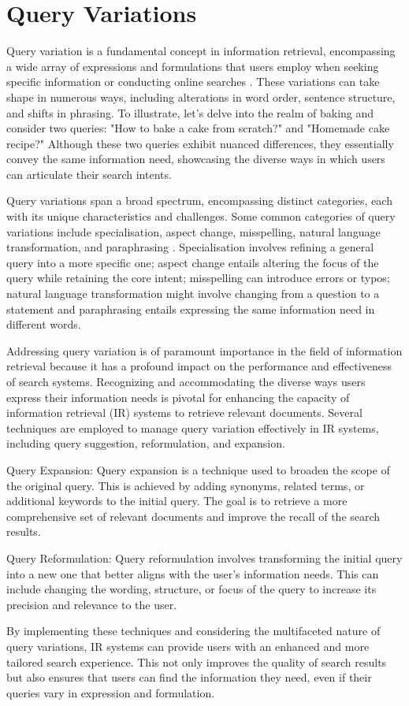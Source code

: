 \section{Query Variations}
Query variation is a fundamental concept in information retrieval, encompassing a wide array of expressions and formulations that users employ when seeking specific information or conducting online searches \cite{zendel}. These variations can take shape in numerous ways, including alterations in word order, sentence structure, and shifts in phrasing. To illustrate, let's delve into the realm of baking and consider two queries: "How to bake a cake from scratch?" and "Homemade cake recipe?" Although these two queries exhibit nuanced differences, they essentially convey the same information need, showcasing the diverse ways in which users can articulate their search intents.

Query variations span a broad spectrum, encompassing distinct categories, each with its unique characteristics and challenges. Some common categories of query variations include specialisation, aspect change, misspelling, natural language transformation, and paraphrasing \cite{penha2022}. Specialisation involves refining a general query into a more specific one; aspect change entails altering the focus of the query while retaining the core intent; misspelling can introduce errors or typos; natural language transformation might involve changing from a question to a statement and paraphrasing entails expressing the same information need in different words.

Addressing query variation is of paramount importance in the field of information retrieval because it has a profound impact on the performance and effectiveness of search systems. Recognizing and accommodating the diverse ways users express their information needs is pivotal for enhancing the capacity of information retrieval (IR) systems to retrieve relevant documents. Several techniques are employed to manage query variation effectively in IR systems, including query suggestion, reformulation, and expansion.

Query Expansion: Query expansion is a technique used to broaden the scope of the original query. This is achieved by adding synonyms, related terms, or additional keywords to the initial query. The goal is to retrieve a more comprehensive set of relevant documents and improve the recall of the search results.

Query Reformulation: Query reformulation involves transforming the initial query into a new one that better aligns with the user's information needs. This can include changing the wording, structure, or focus of the query to increase its precision and relevance to the user.

By implementing these techniques and considering the multifaceted nature of query variations, IR systems can provide users with an enhanced and more tailored search experience. This not only improves the quality of search results but also ensures that users can find the information they need, even if their queries vary in expression and formulation.